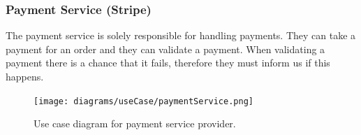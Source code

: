     \subsubsection{Payment Service (Stripe)}
      The payment service is solely responsible for handling payments. They can take a payment for an order and they can
      validate a payment. When validating a payment there is a chance that it fails, therefore they must inform us if this
      happens.
      \begin{figure}[H]
        \centering
        \texttt{[image: diagrams/useCase/paymentService.png]}
        \caption{Use case diagram for payment service provider.}
        \label{fig:UCpayment}
      \end{figure}
\newpage